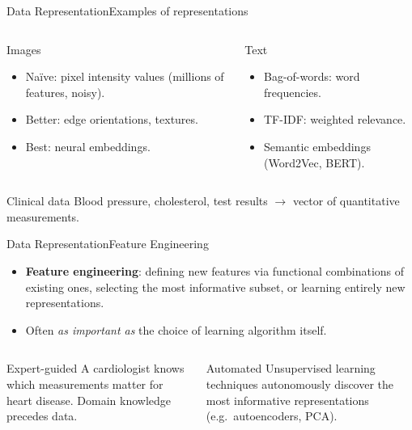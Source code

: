 \begin{frame}{Data Representation}{Examples of representations}
  \begin{columns}[T]
    \begin{exampleblock}{Images}
      \begin{itemize}
        \item Na\"ive: pixel intensity values (millions of features, noisy).
        \item Better: edge orientations, textures.
        \item Best: neural embeddings.
      \end{itemize}
    \end{exampleblock}
    \begin{exampleblock}{Text}
      \begin{itemize}
        \item Bag-of-words: word frequencies.
        \item TF-IDF: weighted relevance.
        \item Semantic embeddings (Word2Vec, BERT).
      \end{itemize}
    \end{exampleblock}
  \end{columns}
  \bigskip
  \begin{exampleblock}{Clinical data}
    Blood pressure, cholesterol, test results $\to$ vector of quantitative measurements.
  \end{exampleblock}
\end{frame}

\begin{frame}{Data Representation}{Feature Engineering}
  \begin{itemize}
    \item \textcolor{AccentBlue}{\textbf{Feature engineering}}: defining new features via
          functional combinations of existing ones, selecting the most informative subset,
          or learning entirely new representations.
    \item Often \emph{as important as} the choice of learning algorithm itself.
  \end{itemize}
  \bigskip
  \begin{columns}[T]
    \begin{block}{Expert-guided}
      A cardiologist knows which measurements matter for heart disease.
      Domain knowledge precedes data.
    \end{block}
    \begin{block}{Automated}
      Unsupervised learning techniques autonomously discover the most informative
      representations (e.g.\ autoencoders, PCA).
    \end{block}
  \end{columns}
\end{frame}

